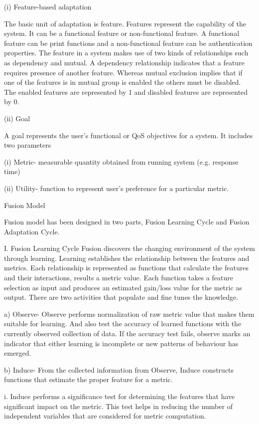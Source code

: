 \begin{compactitem}
(i) Feature-based adaptation

The basic unit of adaptation is feature. Features represent the capability of the system. It can be a functional feature or non-functional feature. A functional feature can be print functions and a non-functional feature can be authentication properties. The feature in a system makes use of two kinds of relationships such as dependency and mutual. A dependency relationship indicates that a feature requires presence of another feature. Whereas mutual exclusion implies that if one of the features is in mutual group is enabled the others must be disabled. The enabled features are represented by 1 and disabled features are represented by 0. 

(ii) Goal

A goal represents the user’s functional or QoS objectives for a system. It includes two parameters

(i) Metric- measurable quantity obtained from running system (e.g. response time) 

(ii) Utility- function to represent user’s preference for a particular metric.

Fusion Model

Fusion model has been designed in two parts, Fusion Learning Cycle and Fusion Adaptation Cycle.

I. Fusion Learning Cycle
Fusion discovers the changing environment of the system through learning. Learning establishes the 
relationship between the features and metrics. Each relationship is represented as functions that 
calculate the features and their interactions, results a metric value. Each function takes a feature selection as input and produces an estimated gain/loss value for the metric as output. There are two activities that populate and fine tunes the knowledge.

a) Observe- Observe performs normalization of raw metric value that makes them suitable for 
learning. And also test the accuracy of learned functions with the currently observed 
collection of data. If the accuracy test fails, observe marks an indicator that either learning is 
incomplete or new patterns of behaviour has emerged.

b) Induce- From the collected information from Observe, Induce constructs functions that 
estimate the proper feature for a metric. 

i. Induce performs a significance test for determining the features that have significant 
impact on the metric. This test helps in reducing the number of independent variables 
that are considered for metric computation.


\end{compactitem}

